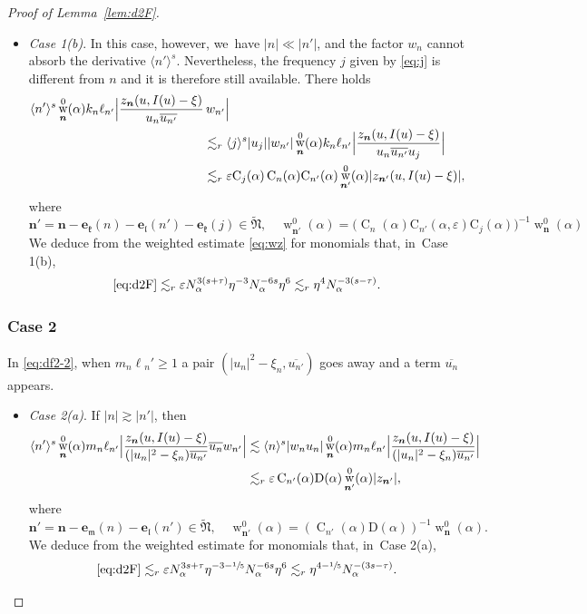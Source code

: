 \documentclass[10pt,a4paper]{amsart}
\DeclareMathOperator{\rw}{w}
\theoremstyle{plain}
\theoremstyle{definition}
\newcommand{\nb}{{\boldsymbol n}}
\newcommand{\Nb}{{\boldsymbol{\mathfrak{N}}}}
\newcommand{\1}{\mathbf{1}}
\let\epsilon\varepsilon
\begin{document}
\begin{proof}[Proof of Lemma~\ref{lem:d2F}]
\begin{itemize}
\item
\textit{Case 1(b)}. In this case, however, we~have
$
|n|\ll |n'|
$,
and the factor $w_{n}$ cannot absorb the derivative $\langle n'\rangle^{s}$. Nevertheless, the frequency $j$ given by \eqref{eq:j} is different from $n$ and it is therefore still available. There holds
\begin{align*}
\langle n'\rangle^{s} \rw_{\nb}^{0}(\alpha)
k_{n}\ell_{n'}
\Bigl|
\frac{z_{\nb}(u,I(u)-\xi)}
{u_{n}\overline{u_{n'}}}&\,w_{n'}
\Bigr|\\
&\lesssim_{r} \langle j\rangle^{s}|u_{j}| |w_{n'}|
\rw_{\nb}^{0}(\alpha)
k_{n}\ell_{n'}
\Bigl|
\frac{z_{\nb}(u,I(u)-\xi)}
{u_{n}\overline{u_{n'}}u_{j}}
\Bigr|\\
&\lesssim_{r}\epsilon\mathrm{C}_j(\alpha)\operatorname{C}_{n}(\alpha)\mathrm{C}_{n'}(\alpha)\rw_{\nb'}^{0}(\alpha)|z_{\nb'}(u,I(u)-\xi)|,
\end{align*}
where
\[
\nb' = \nb - \boldsymbol{e}_{\mathfrak{k}}(n)-\boldsymbol{e}_{\mathfrak{l}}(n')-\boldsymbol{e}_{\mathfrak{k}}(j) \in \widetilde{\Nb},\quad \rw_{\nb'}^{0}(\alpha) = \big(\operatorname{C}_{n}(\alpha)\mathrm{C}_{n'}(\alpha,\epsilon)\mathrm{C}_{j}(\alpha)\big)^{-1}\rw_{\nb}^{0}(\alpha)
\]
We deduce from the weighted estimate \eqref{eq:wz} for monomials that, in~Case 1(b),
\[
\eqref{eq:d2F}\lesssim_{ r}
\epsilon N_{\alpha}^{3(s+\tau)}\eta^{-3}N_{\alpha}^{-6s}\eta^{6}
\lesssim_{r} \eta^{4}N_{\alpha}^{-3(s-\tau)}.
\]
\end{itemize}

\subsubsection*{Case 2} In \eqref{eq:df2-2}, when $m_{n}\ell{_n'}\geq1$ a pair $(|u_{n}|^{2}-\xi_{n},\overline{u_{n'}})$ goes away and a term $\overline{u_{n}}$ appears.

\begin{itemize}
\item
\textit{Case 2(a)}. If
$
|n|\gtrsim |n'|
$,
then
\begin{align*}
\langle n'\rangle^{s}
\rw_{\nb}^{0}(\alpha)
m_{n}\ell_{n'}
\Bigl|
\frac{z_{\nb}(u,I(u)-\xi)}
{(|u_{n}|^{2}-\xi_{n})\overline{u_{n'}}}\overline{u_{n}}w_{n'}
\Bigr|
&
\lesssim
\langle n\rangle^{s}
|w_{n}u_{n}|
\rw_{\nb}^{0}(\alpha)
m_{n}\ell_{n'}
\Bigl|
\frac{z_{\nb}(u,I(u)-\xi)}
{(|u_{n}|^{2}-\xi_{n})\overline{u_{n'}}}
\Bigr| \\
&\lesssim_{r}
\epsilon
\operatorname{C}_{n'}(\alpha)\mathrm{D}(\alpha)
\rw_{\nb'}^{0}(\alpha)|z_{\nb'}|,
\end{align*}
where
\[
\nb'
= \nb-\boldsymbol{e}_{\mathfrak{m}}(n) -\boldsymbol{e}_{\mathfrak{l}}(n')\in\widetilde{\Nb},
\quad
\rw_{\nb'}^{0}(\alpha) = (\operatorname{C}_{n'}(\alpha)\mathrm{D}(\alpha))^{-1}\rw_{\nb}^{0}(\alpha).
\]
We deduce from the weighted estimate for monomials that, in~Case 2(a),
\[
\eqref{eq:d2F}
\lesssim_{r}
\epsilon N_{\alpha}^{3s+\tau}\eta^{-3-\sfrac{1}{5}}N_{\alpha}^{-6s}\eta^{6}
\lesssim_{r}\eta^{4-\sfrac{1}{5}}N_{\alpha}^{-(3s-\tau)}.
\]


\end{itemize}
\end{proof}
\end{document}
